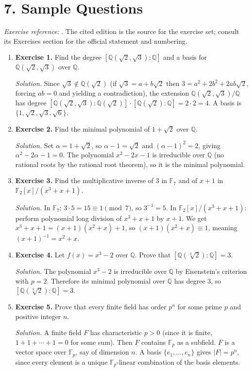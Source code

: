 \section*{7. Sample Questions}
\emph{Exercise reference:} \cite{field_theory_ref1}. The cited edition is the source for the exercise set; consult its Exercises section for the official statement and numbering.
\begin{enumerate}[leftmargin=*,itemsep=0.9em]
\item \textbf{Exercise 1.} Find the degree $[\mathbb{Q}(\sqrt{2},\sqrt{3}):\mathbb{Q}]$ and a basis for $\mathbb{Q}(\sqrt{2},\sqrt{3})$ over $\mathbb{Q}$.

\emph{Solution.} Since $\sqrt{3}\notin\mathbb{Q}(\sqrt{2})$ (if $\sqrt{3}=a+b\sqrt{2}$ then $3=a^2+2b^2+2ab\sqrt{2}$, forcing $ab=0$ and yielding a contradiction), the extension $\mathbb{Q}(\sqrt{2},\sqrt{3})/\mathbb{Q}$ has degree $[\mathbb{Q}(\sqrt{2},\sqrt{3}):\mathbb{Q}(\sqrt{2})]\cdot[\mathbb{Q}(\sqrt{2}):\mathbb{Q}]=2\cdot 2=4$. A basis is $\{1,\sqrt{2},\sqrt{3},\sqrt{6}\}$.

\item \textbf{Exercise 2.} Find the minimal polynomial of $1+\sqrt{2}$ over $\mathbb{Q}$.

\emph{Solution.} Set $\alpha=1+\sqrt{2}$, so $\alpha-1=\sqrt{2}$ and $(\alpha-1)^2=2$, giving $\alpha^2-2\alpha-1=0$. The polynomial $x^2-2x-1$ is irreducible over $\mathbb{Q}$ (no rational roots by the rational root theorem), so it is the minimal polynomial.

\item \textbf{Exercise 3.} Find the multiplicative inverse of $3$ in $\mathbb{F}_7$ and of $x+1$ in $\mathbb{F}_2[x]/(x^3+x+1)$.

\emph{Solution.} In $\mathbb{F}_7$: $3\cdot 5=15\equiv 1\pmod{7}$, so $3^{-1}=5$. In $\mathbb{F}_2[x]/(x^3+x+1)$: perform polynomial long division of $x^3+x+1$ by $x+1$. We get $x^3+x+1=(x+1)(x^2+x)+1$, so $(x+1)(x^2+x)\equiv 1$, meaning $(x+1)^{-1}=x^2+x$.

\item \textbf{Exercise 4.} Let $f(x)=x^3-2$ over $\mathbb{Q}$. Prove that $[\mathbb{Q}(\sqrt[3]{2}):\mathbb{Q}]=3$.

\emph{Solution.} The polynomial $x^3-2$ is irreducible over $\mathbb{Q}$ by Eisenstein's criterion with $p=2$. Therefore its minimal polynomial over $\mathbb{Q}$ has degree $3$, so $[\mathbb{Q}(\sqrt[3]{2}):\mathbb{Q}]=3$.

\item \textbf{Exercise 5.} Prove that every finite field has order $p^n$ for some prime $p$ and positive integer $n$.

\emph{Solution.} A finite field $F$ has characteristic $p>0$ (since it is finite, $1+1+\cdots+1=0$ for some sum). Then $F$ contains $\mathbb{F}_p$ as a subfield. $F$ is a vector space over $\mathbb{F}_p$, say of dimension $n$. A basis $\{e_1,\ldots,e_n\}$ gives $|F|=p^n$, since every element is a unique $\mathbb{F}_p$-linear combination of the basis elements.

\end{enumerate}
